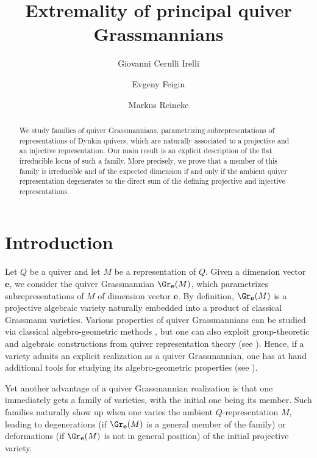 \documentclass{amsart}
\title{Extremality of principal quiver Grassmannians}
\author{Giovanni Cerulli Irelli}
\author{Evgeny Feigin}
\author{Markus Reineke}
\newcommand{\be}{\mathbf{e}}
\numberwithin{equation}{section}
\theoremstyle{remark}
\begin{document}
\begin{abstract}
We study families of quiver Grassmannians, parametrizing subrepresentations of representations of Dyn\-kin quivers, which are naturally associated to a projective and an injective representation. Our main result is an explicit description of the flat irreducible locus of such a family. More precisely, we prove that a member of this family is irreducible and of the expected dimension if and only if the ambient quiver representation degenerates to the direct sum of the defining projective and injective representations.
\end{abstract}

\maketitle

\section{Introduction}
Let $Q$ be a quiver and let $M$ be a representation of $Q$. Given a dimension 
vector $\be$, we consider the quiver Grassmannian $\Gr_\be(M)$, which parametrizes
subrepresentations of $M$ of dimension vector $\be$. By definition, $\Gr_\be(M)$ is a
projective algebraic variety naturally embedded into a product of classical
Grassmann varieties. Various properties of quiver Grassmannians can be studied
via classical algebro-geometric methods \cite{LW19}, but one can also exploit 
group-theoretic
and algebraic constructions from quiver representation theory (see \cite{CI20,CFR12,Fe23}).
Hence, if a variety admits an explicit realization as a quiver Grassmannian,
one has at hand additional tools for studying its algebro-geometric properties 
(see \cite{CFR13-1,Fe11,FFR17}).

Yet another advantage of a quiver Grassmannian realization is that one immediately
gets a family of varieties, with the initial one being its member. Such families
naturally show up when one varies the ambient $Q$-representation $M$, leading to degenerations
(if $\Gr_\be(M)$ is a general member of the family) or deformations (if $\Gr_\be(M)$ is 
not in general position) of the initial projective variety.
\end{document}
